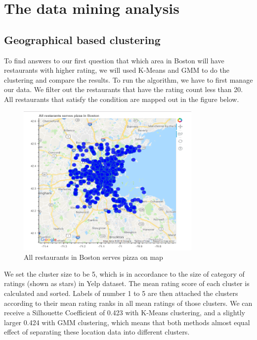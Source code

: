 \documentclass[a4paper]{article}
\begin{document}
\section{The data mining analysis}
\label{sec:theory}

\subsection{Geographical based clustering}
To find answers to our first question that which area in Boston will have restaurants with higher rating, we will used K-Means and GMM to do the clustering and compare the results. To run the algorithm, we have to first manage our data. We filter out the restaurants that have the rating count less than 20. All restaurants that satisfy the condition are mapped out in the figure below.


\begin{figure}[htbp]
\centering
\includegraphics[width=0.8\textwidth]{Picture1.png}
\caption{\label{fig:data}All restaurants in Boston serves pizza on map }
\end{figure}

We set the cluster size to be 5, which is in accordance to the size of category of ratings (shown as stars) in Yelp dataset. The mean rating score of each cluster is calculated and sorted. Labels of number 1 to 5 are then attached the clusters according to their mean rating ranks in all mean ratings of those clusters. We can receive a Silhouette Coefficient of 0.423 with K-Means clustering, and a slightly larger 0.424 with GMM clustering, which means that both methods almost equal effect of separating these location data into different clusters.
\end{document}
